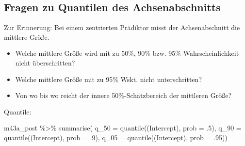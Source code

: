 \documentclass[
  a4paper,
  DIV=11]{scrreprt}
\newenvironment{Shaded}{\begin{snugshade}}{\end{snugshade}}
\newcommand{\AttributeTok}[1]{\textcolor[rgb]{0.40,0.45,0.13}{#1}}
\newcommand{\DecValTok}[1]{\textcolor[rgb]{0.68,0.00,0.00}{#1}}
\newcommand{\FunctionTok}[1]{\textcolor[rgb]{0.28,0.35,0.67}{#1}}
\newcommand{\NormalTok}[1]{\textcolor[rgb]{0.00,0.23,0.31}{#1}}
\newcommand{\SpecialCharTok}[1]{\textcolor[rgb]{0.37,0.37,0.37}{#1}}
\newcommand{\StringTok}[1]{\textcolor[rgb]{0.13,0.47,0.30}{#1}}
\providecommand{\tightlist}{%
  \setlength{\itemsep}{0pt}\setlength{\parskip}{0pt}}\usepackage{longtable,booktabs,array}
\theoremstyle{definition}
\theoremstyle{remark}
\begin{document}
\hypertarget{fragen-zu-quantilen-des-achsenabschnitts}{%
\subsection{Fragen zu Quantilen des
Achsenabschnitts}\label{fragen-zu-quantilen-des-achsenabschnitts}}

\begin{tcolorbox}[enhanced jigsaw, title=\textcolor{quarto-callout-note-color}{\faInfo}\hspace{0.5em}{Hinweis}, bottomtitle=1mm, bottomrule=.15mm, titlerule=0mm, colbacktitle=quarto-callout-note-color!10!white, colframe=quarto-callout-note-color-frame, leftrule=.75mm, left=2mm, toprule=.15mm, colback=white, arc=.35mm, breakable, toptitle=1mm, opacityback=0, rightrule=.15mm, coltitle=black, opacitybacktitle=0.6]

Zur Erinnerung: Bei einem zentrierten Prädiktor misst der
Achsenabschnitt die mittlere Größe.

\end{tcolorbox}

\begin{itemize}
\tightlist
\item
  Welche mittlere Größe wird mit zu 50\%, 90\% bzw. 95\%
  Wahrscheinlichkeit nicht überschritten?
\item
  Welche mittlere Größe mit zu 95\% Wskt. nicht unterschritten?
\item
  Von wo bis wo reicht der innere 50\%-Schätzbereich der mittleren
  Größe?
\end{itemize}

Quantile:

\begin{Shaded}
\begin{Highlighting}[]
\NormalTok{m43a\_post }\SpecialCharTok{\%\textgreater{}\%} 
  \FunctionTok{summarise}\NormalTok{(}
    \AttributeTok{q\_50 =} \FunctionTok{quantile}\NormalTok{(}\StringTok{\textasciigrave{}}\AttributeTok{(Intercept)}\StringTok{\textasciigrave{}}\NormalTok{, }\AttributeTok{prob =}\NormalTok{ .}\DecValTok{5}\NormalTok{),}
    \AttributeTok{q\_90 =} \FunctionTok{quantile}\NormalTok{(}\StringTok{\textasciigrave{}}\AttributeTok{(Intercept)}\StringTok{\textasciigrave{}}\NormalTok{, }\AttributeTok{prob =}\NormalTok{ .}\DecValTok{9}\NormalTok{),}
    \AttributeTok{q\_05 =} \FunctionTok{quantile}\NormalTok{(}\StringTok{\textasciigrave{}}\AttributeTok{(Intercept)}\StringTok{\textasciigrave{}}\NormalTok{, }\AttributeTok{prob =}\NormalTok{ .}\DecValTok{95}\NormalTok{))}
\end{Highlighting}
\end{Shaded}
\end{document}
